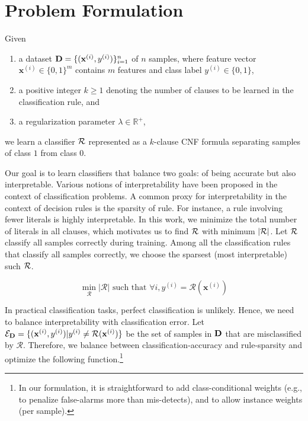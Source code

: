 

 \section{Problem Formulation}
 \label{interpretability_imli_sec:problem}
Given 
\begin{enumerate}
	\item a dataset $ \mathbf{D} = \{(\mathbf{x}^{(i)}, y^{(i)})\}_{i=1}^n$ of $ n $ samples, where feature vector $ \mathbf{x}^{(i)} \in \{0, 1\}^m $ contains $ m $ features and class label $ y^{(i)} \in \{0,1\} $,
	\item a positive integer $ k \ge 1 $ denoting the number of clauses to be learned in the classification rule, and
	\item a regularization parameter $ \lambda \in \mathbb{R}^+ $,
\end{enumerate}
we learn a classifier $ {\mathcal{R}} $ represented as a $ k $-clause CNF formula separating samples of class $ 1 $ from class $ 0 $. 
 
 

 Our goal is to learn classifiers that balance two 
 goals: of  being accurate but also interpretable.  
 Various notions of interpretability have been proposed in the context of   classification problems. A common proxy for interpretability in the context of decision rules 
 is the sparsity of rule. For instance, a rule involving fewer literals is highly interpretable.  In this work, we minimize the total number of literals in all clauses, which motivates us to  find $ {\mathcal{R}}  $ with minimum  $ |{\mathcal{R}}| $. Let $ {\mathcal{R}} $ classify all samples correctly during training. Among all the classification rules that classify all samples correctly,  we choose the sparsest (most interpretable) such $ {\mathcal{R}} $. 
 
 

 \[
 \min\limits_{\mathcal{R}} |\mathcal{R}|\text{ such that }\forall i, y^{(i)}=\mathcal{R}(\mathbf{x}^{(i)})
 \]

 

 In practical classification tasks, perfect classification is unlikely. Hence, we need to balance interpretability with classification error.  Let $ \mathcal{E}_{\mathbf{D}} = \{(\mathbf{x}^{(i)},y^{(i)}) | y^{(i)} \ne \mathcal{R}(\mathbf{x}^{(i)}) \} $   be  the set of samples in $ \mathbf{D} $ that are misclassified  by $ \mathcal{R} $. Therefore, we balance between classification-accuracy and rule-sparsity and optimize the following function.\footnote{In our formulation, it is  straightforward to add class-conditional weights  (e.g., to penalize  false-alarms more than mis-detects), and to allow instance weights (per sample).}

